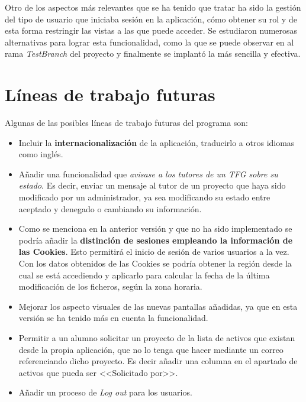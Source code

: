 Otro de los aspectos más relevantes que se ha tenido que tratar ha sido la gestión del tipo de usuario que iniciaba sesión en la aplicación, cómo obtener su rol y de esta forma restringir las vistas a las que puede acceder. Se estudiaron numerosas alternativas para lograr esta funcionalidad, como la que se puede observar en al rama \emph{TestBranch} del proyecto y finalmente se implantó la más sencilla y efectiva.

\section{Líneas de trabajo futuras}

Algunas de las posibles líneas de trabajo futuras del programa son:

\begin{itemize}
	\item Incluir la \textbf{internacionalización} de la aplicación, traducirlo a otros idiomas como inglés.
	\item Añadir una funcionalidad que \emph{avisase a los tutores de un TFG sobre su estado}. Es decir, enviar un mensaje al tutor de un proyecto que haya sido modificado por un administrador, ya sea modificando su estado entre aceptado y denegado o cambiando su información.
	\item Como se menciona en la anterior versión y que no ha sido implementado se podría añadir la \textbf{distinción de sesiones empleando la información de
	las Cookies}. Esto permitirá el inicio de sesión de varios usuarios a la
	vez. Con los datos obtenidos de las Cookies se podría obtener la región
	desde la cual se está accediendo y aplicarlo para calcular la fecha de
	la última modificación de los ficheros, según la zona horaria.
	\item Mejorar los aspecto visuales de las nuevas pantallas añadidas, ya que en esta versión se ha tenido más en cuenta la funcionalidad.
	\item Permitir a un alumno solicitar un proyecto de la lista de activos que existan desde la propia aplicación, que no lo tenga que hacer mediante un correo referenciando dicho proyecto. Es decir añadir una columna en el apartado de activos que pueda ser <<Solicitado por>>.
	\item Añadir un proceso de \emph{Log out} para los usuarios.
	
\end{itemize}